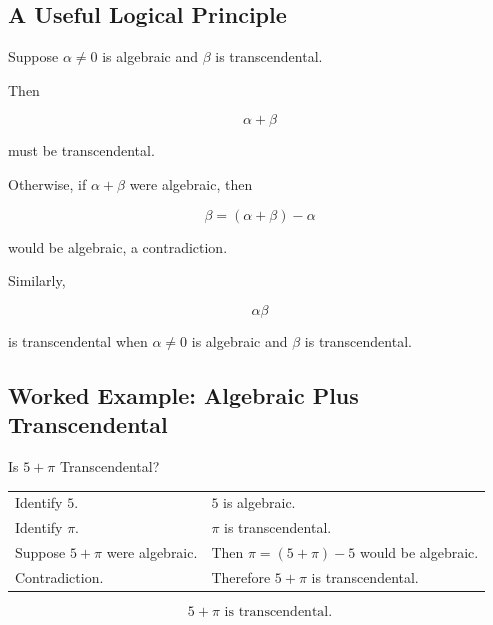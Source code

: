 \subsection{A Useful Logical Principle}
\label{subsec:transcendence-logical-principle}

Suppose \(\alpha\neq0\) is algebraic and \(\beta\) is transcendental.

Then

\[ \alpha+\beta \]

must be transcendental.

Otherwise, if \(\alpha+\beta\) were algebraic, then

\[ \beta=(\alpha+\beta)-\alpha \]

would be algebraic, a contradiction.

Similarly,

\[ \alpha\beta \]

is transcendental when \(\alpha\neq0\) is algebraic and \(\beta\) is
transcendental.

\subsection{Worked Example: Algebraic Plus Transcendental}
\label{subsec:worked-algebraic-plus-transcendental}

\begin{workedexamplebox}{Is \(5+\pi\) Transcendental?}

\begin{tabularx}{\textwidth}{@{}>{\raggedright\arraybackslash}p{}X@{}}
Identify \(5\). & \(5\) is algebraic.\\
Identify \(\pi\). & \(\pi\) is transcendental.\\
Suppose \(5+\pi\) were algebraic. & Then \(\pi=(5+\pi)-5\) would be algebraic.\\
Contradiction. & Therefore \(5+\pi\) is transcendental.
\end{tabularx}

\begin{answerbox}
\[ \boxed{5+\pi\text{ is transcendental}.} \]
\end{answerbox}
\end{workedexamplebox}

